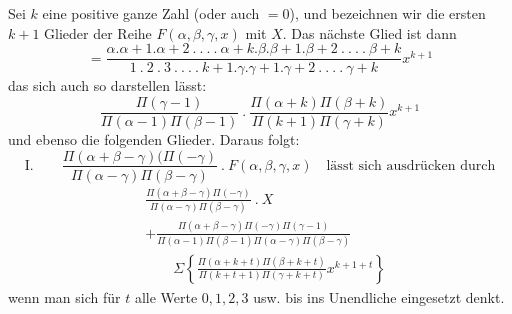 
Sei $k$ eine positive ganze Zahl (oder auch $=0$), und bezeichnen wir die ersten $k+1$ Glieder der Reihe $F(\alpha,\beta,\gamma,x)$ mit $X$. Das nächste Glied ist dann
\[
=\frac{\alpha.\alpha+1.\alpha+2\ .\ .\ .\ .\ \alpha+k.\beta.\beta+1.\beta+2\ .\ .\ .\ .\ \beta+k}
{1\ .\ 2\ .\ 3\ .\ .\ .\ .\ k+1.\gamma.\gamma+1.\gamma+2\ .\ .\ .\ .\ \gamma+k}x^{k+1}
\]
das sich auch so darstellen lässt:
\[
\frac{\Pi(\gamma-1)}{\Pi(\alpha-1)\Pi(\beta-1)}\ .\
\frac{\Pi(\alpha+k)\Pi(\beta+k)}{\Pi(k+1)\Pi(\gamma+k)}x^{k+1}
\]
und ebenso die folgenden Glieder. Daraus folgt:
\[
\mathrm{I.}\qquad
\frac{\Pi(\alpha+\beta-\gamma)(\Pi(-\gamma)}{\Pi(\alpha-\gamma)\Pi(\beta-\gamma)}\ .\ F(\alpha,\beta,\gamma,x)
\quad\text{lässt sich ausdrücken durch}
\]
\[
\begin{aligned}&\frac{\Pi(\alpha+\beta-\gamma)\Pi(-\gamma)}{\Pi(\alpha-\gamma)\Pi(\beta-\gamma)}\ .\ X\\&+\frac{\Pi(\alpha+\beta-\gamma)\Pi(-\gamma)\Pi(\gamma-1)}{\Pi(\alpha-1)\Pi(\beta-1)\Pi(\alpha-\gamma)\Pi(\beta-\gamma)}\\&\qquad\Sigma\left\{\frac{\Pi(\alpha+k+t)\Pi(\beta+k+t)}{\Pi(k+t+1)\Pi(\gamma+k+t)}x^{k+1+t}\right\}\end{aligned}
\]
wenn man sich für $t$ alle Werte $0,1,2,3$ usw. bis ins Unendliche eingesetzt denkt.


